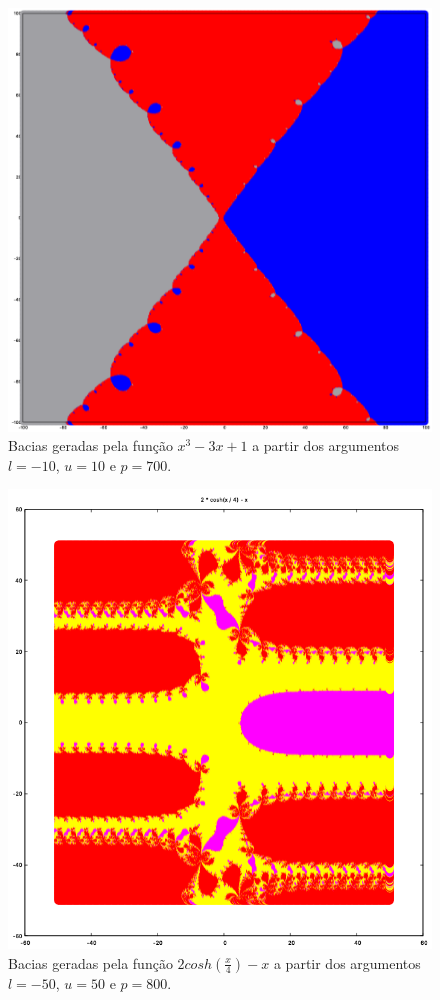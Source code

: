\documentclass[11pt,reqno,a4paper]{amsart}
\begin{document}
\begin{figure}[p]
    \centering
    \includegraphics[width=15cm]{function_1.png}
    \caption{Bacias geradas pela função $x^3 - 3x + 1$ a partir dos argumentos $l = -10$, $u = 10$ e $p = 700$.}
    \label{fig:images/function_1}
\end{figure}

\begin{figure}[p]
    \centering
    \includegraphics[width=15cm]{function_2.png}
    \caption{Bacias geradas pela função $2cosh(\frac{x}{4}) - x$ a partir dos argumentos $l = -50$, $u = 50$ e $p = 800$.}
    \label{fig:function_2}
\end{figure}
\end{document}
